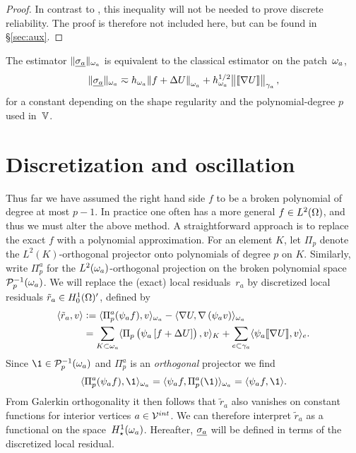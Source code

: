 \documentclass[thesis.tex]{subfiles}
\begin{document}
  \begin{proof}
    In contrast to \cite{cascon2012}, this inequality will not be needed to prove discrete reliability.
    The proof is therefore not included here, but can be found in \S\ref{sec:aux}.
  \end{proof}
\begin{cor}
  \label{lem:starequiv}
  The estimator $\| \underline{\sigma_a} \|_{\omega_a}$ is equivalent to the classical estimator on the patch~$\omega_a$, 
  \[
    \| \underline{\sigma_a} \|_{\omega_a} \eqsim h_{\omega_a}\norm{f + \Delta U}_{\omega_a} + h^{1/2}_{\omega_a} \norm{\llbracket \nabla U  \rrbracket}_{\gamma_a},
  \]
  for a constant depending on the shape regularity and the polynomial-degree $p$ used in~$\mathbb{V}$.
\end{cor}
\section{Discretization and oscillation}
\label{sec:oscillation}
Thus far we have assumed the right hand side $f$ to be a broken polynomial of degree at most $p-1$. In practice one 
often has a more general $f \in L^2(\Omega)$, and thus we must alter the above method.
A straightforward approach is to replace the exact $f$ with a polynomial approximation. 
For an element $K$, let  $\Pi_p$ denote the $L^2(K)$-orthogonal projector onto polynomials of degree $p$ on $K$.
Similarly, write $\Pi_p^a$ for the $L^2(\omega_a)$-orthogonal projection on the broken polynomial space $\mathcal{P}_p^{-1}(\omega_a)$.
We will replace the (exact) local residuals~$r_a$ by discretized local residuals  $\tilde r_a  \in H_0^1(\Omega)'$,  defined by 
\begin{align*}
  \langle \tilde r_a, v \rangle &:= \langle \Pi_p^a(\psi_af),v \rangle_{\omega_a} - \langle \nabla U, \nabla \left(\psi_a v\right) \rangle_{\omega_a} \\
   &= \sum_{K \subset \omega_a} \langle \Pi_p \left(\psi_a \left[f + \Delta U\right]\right), v \rangle_K 
  +\sum_{e \subset \gamma_a} \langle \psi_a \llbracket \nabla U\rrbracket, v \rangle_e.
\end{align*}
Since $\1 \in \P_p^{-1}(\w_a)$ and $\Pi_p^a$ is an \emph{orthogonal} projector we find 
\[
  \ip{\Pi_p^a(\psi_a f), \1}_{\w_a} = \ip{\psi_a f, \Pi_p^a(\1)}_{\w_a} = \ip{\psi_a f, \1}.
\]
From Galerkin orthogonality it then follows that $\tilde r_a$ also vanishes on constant functions for interior vertices $a \in \mathcal{V}^{int}$.
We can therefore interpret
$\tilde r_a$ as a functional on the space~$H_\star^1(\omega_a)$.
Hereafter, $\underline{\sigma_a}$ will be  defined in terms of the discretized local residual.
\end{document}
